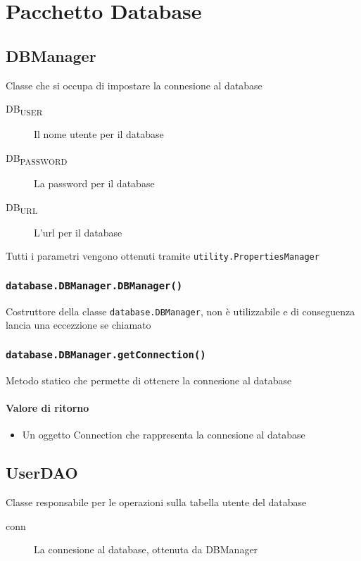 \section{Pacchetto Database}
\label{sec:package_database}

\subsection{DBManager}
Classe che si occupa di impostare la connesione al database
\begin{description}
\item[DB\textsubscript{USER}]  Il nome utente per il database
\item[DB\textsubscript{PASSWORD}] La password per il database
\item[DB\textsubscript{URL}]  L'url per il database
\end{description}
Tutti i parametri vengono ottenuti tramite \texttt{utility.PropertiesManager}
\subsubsection{\texttt{database.DBManager.DBManager()}}
Costruttore della classe \texttt{database.DBManager}, non è utilizzabile e di conseguenza
lancia una eccezzione se chiamato

\subsubsection{\texttt{database.DBManager.getConnection()}}
Metodo statico che permette di ottenere la connesione al database
\paragraph{Valore di ritorno}
\begin{itemize}
\item Un oggetto Connection che rappresenta la connesione al database
\end{itemize}


\subsection{UserDAO}
Classe responsabile per le operazioni sulla
tabella utente del database
\begin{description}
\item[conn] La connesione al database, ottenuta da DBManager
\end{description}

